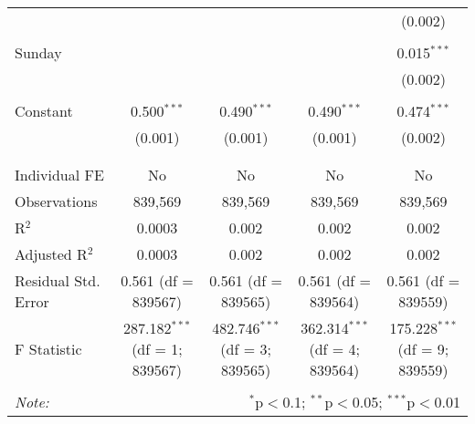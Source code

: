 \documentclass[
]{article}
\begin{document}
\begin{table}[!htbp]
{\begin{tabular}{@{\extracolsep{5pt}}lcccc}
  &  &  &  & (0.002) \\ 
  & & & & \\ 
 Sunday &  &  &  & 0.015$^{***}$ \\ 
  &  &  &  & (0.002) \\ 
  & & & & \\ 
 Constant & 0.500$^{***}$ & 0.490$^{***}$ & 0.490$^{***}$ & 0.474$^{***}$ \\ 
  & (0.001) & (0.001) & (0.001) & (0.002) \\ 
  & & & & \\ 
\hline \\[-1.8ex] 
Individual FE & No & No & No & No \\ 
Observations & 839,569 & 839,569 & 839,569 & 839,569 \\ 
R$^{2}$ & 0.0003 & 0.002 & 0.002 & 0.002 \\ 
Adjusted R$^{2}$ & 0.0003 & 0.002 & 0.002 & 0.002 \\ 
Residual Std. Error & 0.561 (df = 839567) & 0.561 (df = 839565) & 0.561 (df = 839564) & 0.561 (df = 839559) \\ 
F Statistic & 287.182$^{***}$ (df = 1; 839567) & 482.746$^{***}$ (df = 3; 839565) & 362.314$^{***}$ (df = 4; 839564) & 175.228$^{***}$ (df = 9; 839559) \\ 
\hline 
\hline \\[-1.8ex] 
\textit{Note:}  & \multicolumn{4}{r}{$^{*}$p$<$0.1; $^{**}$p$<$0.05; $^{***}$p$<$0.01} \\ 
\end{tabular}
} 
\end{table} 
\newpage
\end{document}
